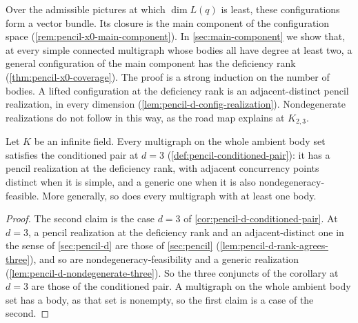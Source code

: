 Over the admissible pictures at which $\dim L(q)$ is least, these
configurations form a vector bundle. Its closure is the main component
of the configuration space (\cref{rem:pencil-x0-main-component}). In
\cref{sec:main-component} we show that, at every simple connected
multigraph whose bodies all have degree at least two, a general
configuration of the main component has the deficiency rank
(\cref{thm:pencil-x0-coverage}). The proof is a strong induction
on the number of bodies. A lifted configuration at the deficiency rank
is an adjacent-distinct pencil realization, in every dimension
(\cref{lem:pencil-d-config-realization}). Nondegenerate realizations do
not follow in this way, as the road map explains at $K_{2,3}$.

\begin{theorem}
  \label{thm:pencil-realization-theorem}
  \leanok
  Let $K$ be an infinite field. Every multigraph on the whole ambient
  body set satisfies the conditioned pair at $d = 3$
  (\cref{def:pencil-conditioned-pair}): it has a pencil realization at
  the deficiency rank, with adjacent concurrency points distinct when it
  is simple, and a generic one when it is also nondegeneracy-feasible.
  More generally, so does every multigraph with at least one body.
\end{theorem}
\begin{proof}
  \leanok
  The second claim is the case $d = 3$ of
  \cref{cor:pencil-d-conditioned-pair}. At $d = 3$, a pencil realization
  at the deficiency rank and an adjacent-distinct one in the sense of
  \cref{sec:pencil-d} are those of \cref{sec:pencil}
  (\cref{lem:pencil-d-rank-agrees-three}), and so are
  nondegeneracy-feasibility and a generic realization
  (\cref{lem:pencil-d-nondegenerate-three}). So the three conjuncts of the
  corollary at $d = 3$ are those of the conditioned pair. A multigraph on
  the whole ambient body set has a body, as that set is nonempty, so the
  first claim is a case of the second.
\end{proof}
